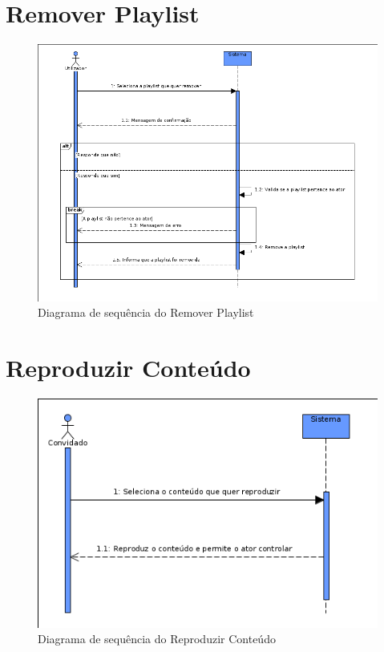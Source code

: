 \documentclass[a4paper]{report}
\begin{document}
\section{Remover Playlist}

\begin{figure}[H]
	\centering 
    \includegraphics[width=\textwidth]{images/remplaylistSeq.png}  
    \caption{Diagrama de sequência do Remover Playlist}
\end{figure}

\section{Reproduzir Conteúdo}

\begin{figure}[H]
	\centering 
    \includegraphics[width=\textwidth]{images/repconteudoSeq.png}  
    \caption{Diagrama de sequência do Reproduzir Conteúdo}
\end{figure}
\end{document}
